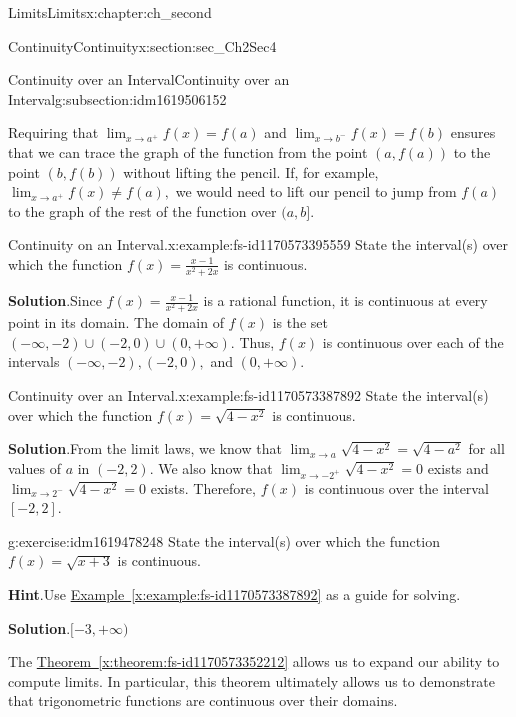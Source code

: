 \documentclass[oneside,10pt,]{book}
\newcommand{\blocktitlefont}{\relax}
\newcommand{\xreffont}{\relax}
\numberwithin{equation}{section}
\begin{document}
\begin{chapterptx}{Limits}{}{Limits}{}{}{x:chapter:ch_second}
\begin{sectionptx}{Continuity}{}{Continuity}{}{}{x:section:sec_Ch2Sec4}
\begin{subsectionptx}{Continuity over an Interval}{}{Continuity over an Interval}{}{}{g:subsection:idm1619506152}
\par
Requiring that \(\lim_{x\to a^+}f(x)=f(a)\) and \(\lim_{x\to b^-}f(x)=f(b)\) ensures that we can trace the graph of the function from the point \((a,f(a))\) to the point \((b,f(b))\) without lifting the pencil. If, for example, \(\lim_{x\to a^+}f(x)\neq f(a),\) we would need to lift our pencil to jump from \(f(a)\) to the graph of the rest of the function over \((a,b].\)%
\begin{example}{Continuity on an Interval.}{x:example:fs-id1170573395559}%
State the interval(s) over which the function \(f(x)=\frac{x-1}{x^2+2x}\) is continuous.%
\par\smallskip%
\noindent\textbf{\blocktitlefont Solution}.\hypertarget{g:solution:idm1619484392}{}\quad{}Since \(f(x)=\frac{x-1}{x^2+2x}\) is a rational function, it is continuous at every point in its domain. The domain of \(f(x)\) is the set \((-\infty ,-2)\cup (-2,0)\cup (0,+\infty ).\) Thus, \(f(x)\) is continuous over each of the intervals \((-\infty ,-2),(-2,0),\) and \((0,+\infty ).\)%
\end{example}
\begin{example}{Continuity over an Interval.}{x:example:fs-id1170573387892}%
State the interval(s) over which the function \(f(x)=\sqrt{4-x^2}\) is continuous.%
\par\smallskip%
\noindent\textbf{\blocktitlefont Solution}.\hypertarget{g:solution:idm1619482216}{}\quad{}From the limit laws, we know that \(\lim_{x\to a}\sqrt{4-x^2}=\sqrt{4-a^2}\) for all values of \(a\) in \((-2,2).\) We also know that \(\lim_{x\to  -2^+}\sqrt{4-x^2}=0\) exists and \(\lim_{x\to  2^-}\sqrt{4-x^2}=0\) exists. Therefore, \(f(x)\) is continuous over the interval \([-2,2].\)%
\end{example}
\begin{inlineexercise}{}{g:exercise:idm1619478248}%
State the interval(s) over which the function \(f(x)=\sqrt{x+3}\) is continuous.%
\par\smallskip%
\noindent\textbf{\blocktitlefont Hint}.\hypertarget{g:hint:idm1619477864}{}\quad{}Use \hyperref[x:example:fs-id1170573387892]{Example~{\xreffont\ref{x:example:fs-id1170573387892}}} as a guide for solving.%
\par\smallskip%
\noindent\textbf{\blocktitlefont Solution}.\hypertarget{g:solution:idm1619478376}{}\quad{}\([-3,+\infty )\)%
\end{inlineexercise}%
The \hyperref[x:theorem:fs-id1170573352212]{Theorem~{\xreffont\ref{x:theorem:fs-id1170573352212}}} allows us to expand our ability to compute limits. In particular, this theorem ultimately allows us to demonstrate that trigonometric functions are continuous over their domains.%

\end{subsectionptx}
\end{sectionptx}
\end{chapterptx}
\end{document}
